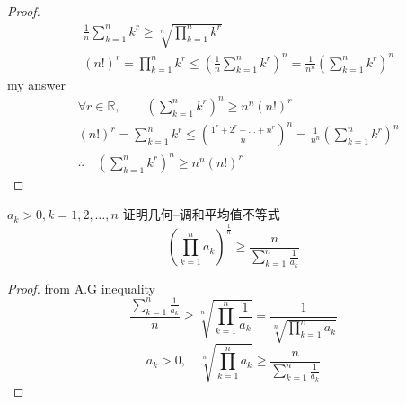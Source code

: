 \begin{example}
\begin{proof}
		\begin{align*}
			&\frac{1}{n}\sum_{k=1}^n k^r \ge \sqrt[n]{\prod_{k=1}^n k^r}\\
			&(n!)^r =\prod_{k=1}^n k^r \leqslant (\frac{1}{n}\sum_{k=1}^n k^r)^n = \frac{1}{n^n}(\sum_{k=1}^n k^r)^n 
		\end{align*}
	my answer
	\begin{align*}
		&\forall r\in \mathbb{R},\qquad(\sum_{k=1}^n k^r)^n \ge n^n(n!)^r\\
		&(n!)^r = \sum_{k=1}^n k^r \leqslant (\frac{1^r+2^r+\dots+n^r}{n})^n = \frac{1}{n^n}(\sum_{k=1}^n k^r)^n\\
		&\therefore\quad (\sum_{k=1}^n k^r)^n \ge n^n(n!)^r
 	\end{align*}
	\end{proof}
\end{example}

\begin{example}
	$ a_k>0, k = 1,2,\dots,n$ 证明几何--调和平均值不等式
	\[(\prod_{k=1}^n a_k)^{\frac{1}{n}} \ge \frac{n}{\sum_{k=1}^n\frac{1}{a_k}}\]
	\begin{proof}
		from A.G inequality
		\[\frac{\sum_{k=1}^n\frac{1}{a_k}}{n} \ge \sqrt[n]{\prod_{k=1}^n \frac{1}{a_k}} = \frac{1}{\sqrt[n]{\prod_{k=1}^n a_k}}\]
		\[a_k>0, \quad \sqrt[n]{\prod_{k=1}^n {a_k}} \ge  \frac{n}{\sum_{k=1}^n\frac{1}{a_k}} \]
	\end{proof}
\end{example}

